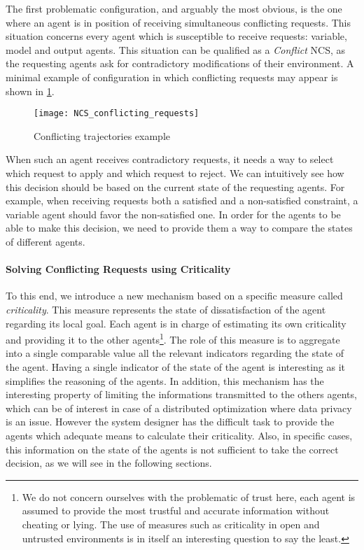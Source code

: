 The first problematic configuration, and arguably the most obvious, is the one where an agent is in position of receiving simultaneous conflicting requests. This situation concerns every agent which is susceptible to receive requests: variable, model and output agents. This situation can be qualified as a \emph{Conflict} NCS, as the requesting agents ask for contradictory modifications of their environment. A minimal example of configuration in which conflicting requests may appear is shown in \figurename{} \ref{NCS_conflicting_requests}.

\begin{figure}
\centering
\texttt{[image: NCS\_conflicting\_requests]}
\caption{Conflicting trajectories example}\label{NCS_conflicting_requests}
\end{figure}

When such an agent receives contradictory requests, it needs a way to select which request to apply and which request to reject. We can intuitively see how this decision should be based on the current state of the requesting agents. For example, when receiving requests both a satisfied and a non-satisfied constraint, a variable agent should favor the non-satisfied one. In order for the agents to be able to make this decision, we need to provide them a way to compare the states of different agents.

\paragraph*{Solving Conflicting Requests using Criticality}
To this end, we introduce a new mechanism based on a specific measure called \emph{criticality}. This measure represents the state of dissatisfaction of the agent regarding its local goal. Each agent is in charge of estimating its own criticality and providing it to the other agents\footnote{We do not concern ourselves with the problematic of trust here, each agent is assumed to provide the most trustful and accurate information without cheating or lying. The use of measures such as criticality in open and untrusted environments is in itself an interesting question to say the least.}. The role of this measure is to aggregate into a single comparable value all the relevant indicators regarding the state of the agent. Having a single indicator of the state of the agent is interesting as it simplifies the reasoning of the agents. In addition, this mechanism has the interesting property of limiting the informations transmitted to the others agents, which can be of interest in case of a distributed optimization where data privacy is an issue.
However the system designer has the difficult task to provide the agents which adequate means to calculate their criticality. Also, in specific cases, this information on the state of the agents is not sufficient to take the correct decision, as we will see in the following sections.

